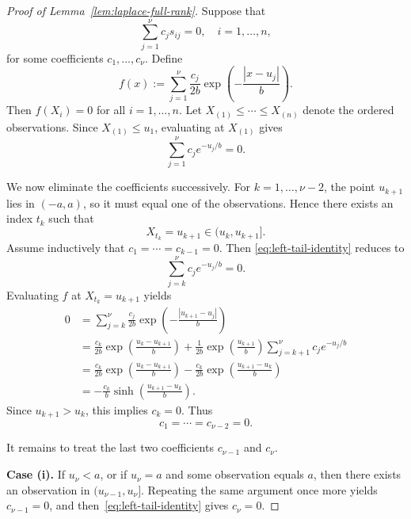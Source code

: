 \documentclass[10pt,a4paper]{amsart}
\begin{document}
\begin{proof}[Proof of Lemma~\ref{lem:laplace-full-rank}]
Suppose that
\begin{equation*}
\sum_{j=1}^\nu c_j s_{ij}=0,\quad i=1,\dots,n,
\end{equation*}
for some coefficients $c_1,\dots,c_\nu$. Define
\begin{equation*}
f(x):=\sum_{j=1}^\nu \frac{c_j}{2b}\exp\left(-\frac{|x-u_j|}{b}\right).
\end{equation*}
Then $f(X_i)=0$ for all $i=1,\dots,n$.
Let $X_{(1)}\le \cdots \le X_{(n)}$ denote the ordered observations. Since $X_{(1)}\le u_1$, evaluating at $X_{(1)}$ gives
\begin{equation}\label{eq:left-tail-identity}
\sum_{j=1}^\nu c_j e^{-u_j/b}=0.
\end{equation}

We now eliminate the coefficients successively. For $k=1,\dots,\nu-2$, the point $u_{k+1}$ lies in $(-a,a)$, so it must equal one of the observations. Hence there exists an index $t_k$ such that
\begin{equation*}
X_{t_k}=u_{k+1}\in (u_k,u_{k+1}].
\end{equation*}
Assume inductively that $c_1=\cdots=c_{k-1}=0$. Then \eqref{eq:left-tail-identity} reduces to
\begin{equation*}
\sum_{j=k}^\nu c_j e^{-u_j/b}=0.
\end{equation*}
Evaluating $f$ at $X_{t_k}=u_{k+1}$ yields
\begin{align*}
0&=\sum_{j=k}^\nu \frac{c_j}{2b}\exp\left(-\frac{|u_{k+1}-u_j|}{b}\right) \\
&=\frac{c_k}{2b}\exp\left(\frac{u_k-u_{k+1}}{b}\right)+\frac{1}{2b}\exp\left(\frac{u_{k+1}}{b}\right)\sum_{j=k+1}^\nu c_j e^{-u_j/b} \\
&=\frac{c_k}{2b}\exp\left(\frac{u_k-u_{k+1}}{b}\right)-\frac{c_k}{2b}\exp\left(\frac{u_{k+1}-u_k}{b}\right) \\
&=-\frac{c_k}{b}\sinh\left(\frac{u_{k+1}-u_k}{b}\right).
\end{align*}
Since $u_{k+1}>u_k$, this implies $c_k=0$. Thus
\begin{equation*}
c_1=\cdots=c_{\nu-2}=0.
\end{equation*}

It remains to treat the last two coefficients $c_{\nu-1}$ and $c_\nu$.

\textbf{Case (i).} If $u_\nu<a$, or if $u_\nu=a$ and some observation equals $a$, then there exists an observation in $(u_{\nu-1},u_\nu]$. Repeating the same argument once more yields $c_{\nu-1}=0$, and then~\eqref{eq:left-tail-identity} gives $c_\nu=0$.


\end{proof}
\end{document}
